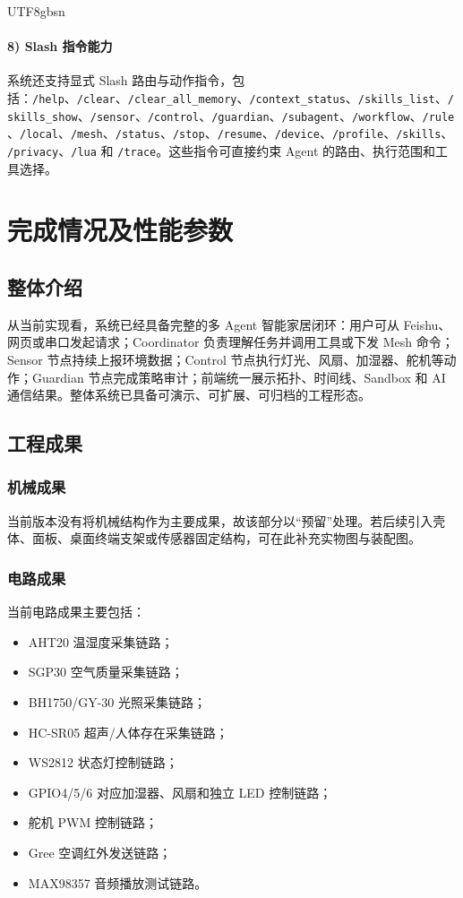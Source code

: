 \documentclass[a4paper,12pt]{article}
\begin{document}
\begin{CJK*}{UTF8}{gbsn}
\paragraph{8) Slash 指令能力}
系统还支持显式 Slash 路由与动作指令，包括：\texttt{/help}、\texttt{/clear}、\texttt{/clear\_all\_memory}、\texttt{/context\_status}、\texttt{/skills\_list}、\texttt{/skills\_show}、\texttt{/sensor}、\texttt{/control}、\texttt{/guardian}、\texttt{/subagent}、\texttt{/workflow}、\texttt{/rule}、\texttt{/local}、\texttt{/mesh}、\texttt{/status}、\texttt{/stop}、\texttt{/resume}、\texttt{/device}、\texttt{/profile}、\texttt{/skills}、\texttt{/privacy}、\texttt{/lua} 和 \texttt{/trace}。这些指令可直接约束 Agent 的路由、执行范围和工具选择。

\section{完成情况及性能参数}

\subsection{整体介绍}
从当前实现看，系统已经具备完整的多 Agent 智能家居闭环：用户可从 Feishu、网页或串口发起请求；Coordinator 负责理解任务并调用工具或下发 Mesh 命令；Sensor 节点持续上报环境数据；Control 节点执行灯光、风扇、加湿器、舵机等动作；Guardian 节点完成策略审计；前端统一展示拓扑、时间线、Sandbox 和 AI 通信结果。整体系统已具备可演示、可扩展、可归档的工程形态。

\subsection{工程成果}

\subsubsection{机械成果}
当前版本没有将机械结构作为主要成果，故该部分以“预留”处理。若后续引入壳体、面板、桌面终端支架或传感器固定结构，可在此补充实物图与装配图。

\subsubsection{电路成果}
当前电路成果主要包括：
\begin{itemize}
  \item AHT20 温湿度采集链路；
  \item SGP30 空气质量采集链路；
  \item BH1750/GY-30 光照采集链路；
  \item HC-SR05 超声/人体存在采集链路；
  \item WS2812 状态灯控制链路；
  \item GPIO4/5/6 对应加湿器、风扇和独立 LED 控制链路；
  \item 舵机 PWM 控制链路；
  \item Gree 空调红外发送链路；
  \item MAX98357 音频播放测试链路。
\end{itemize}


\end{CJK*}
\end{document}
